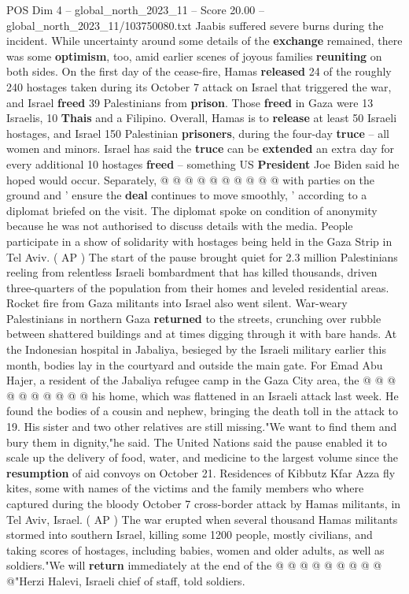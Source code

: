 \begin{textsample}{POS Dim 4 – global\_north\_2023\_11 – Score 20.00 – global\_north\_2023\_11/103750080.txt}
Jaabis suffered severe burns during the incident.
While uncertainty around some details of the \textbf{exchange} remained, there was some \textbf{optimism}, too, amid earlier scenes of joyous families \textbf{reuniting} on both sides.
On the first day of the cease-fire, Hamas \textbf{released} 24 of the roughly 240 hostages taken during its October 7 attack on Israel that triggered the war, and Israel \textbf{freed} 39 Palestinians from \textbf{prison}.
Those \textbf{freed} in Gaza were 13 Israelis, 10 \textbf{Thais} and a Filipino.
Overall, Hamas is to \textbf{release} at least 50 Israeli hostages, and Israel 150 Palestinian \textbf{prisoners}, during the four-day \textbf{truce} -- all women and minors.
Israel has said the \textbf{truce} can be \textbf{extended} an extra day for every additional 10 hostages \textbf{freed} -- something US \textbf{President} Joe Biden said he hoped would occur.
Separately, @ @ @ @ @ @ @ @ @ @ with parties on the ground and ' ensure the \textbf{deal} continues to move smoothly, ' according to a diplomat briefed on the visit.
The diplomat spoke on condition of anonymity because he was not authorised to discuss details with the media.
People participate in a show of solidarity with hostages being held in the Gaza Strip in Tel Aviv. ( AP ) The start of the pause brought quiet for 2.3 million Palestinians reeling from relentless Israeli bombardment that has killed thousands, driven three-quarters of the population from their homes and leveled residential areas.
Rocket fire from Gaza militants into Israel also went silent.
War-weary Palestinians in northern Gaza \textbf{returned} to the streets, crunching over rubble between shattered buildings and at times digging through it with bare hands.
At the Indonesian hospital in Jabaliya, besieged by the Israeli military earlier this month, bodies lay in the courtyard and outside the main gate.
For Emad Abu Hajer, a resident of the Jabaliya refugee camp in the Gaza City area, the @ @ @ @ @ @ @ @ @ @ his home, which was flattened in an Israeli attack last week.
He found the bodies of a cousin and nephew, bringing the death toll in the attack to 19.
His sister and two other relatives are still missing."We want to find them and bury them in dignity,"he said.
The United Nations said the pause enabled it to scale up the delivery of food, water, and medicine to the largest volume since the \textbf{resumption} of aid convoys on October 21.
Residences of Kibbutz Kfar Azza fly kites, some with names of the victims and the family members who where captured during the bloody October 7 cross-border attack by Hamas militants, in Tel Aviv, Israel. ( AP ) The war erupted when several thousand Hamas militants stormed into southern Israel, killing some 1200 people, mostly civilians, and taking scores of hostages, including babies, women and older adults, as well as soldiers."We will \textbf{return} immediately at the end of the @ @ @ @ @ @ @ @ @ @"Herzi Halevi, Israeli chief of staff, told soldiers.

\end{textsample}
